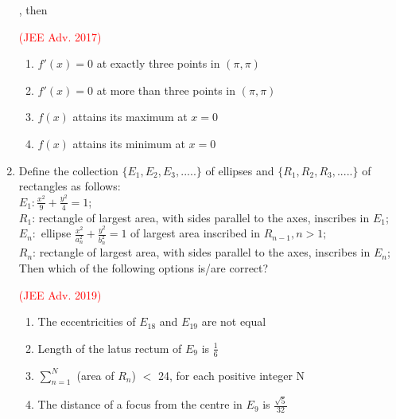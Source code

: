 \documentclass[journal,12pt,twocolumn]{IEEEtran}
\theoremstyle{remark}
\begin{document}
\begin{enumerate}[start = 7]
{\begin{flushleft}
\begin{tabular}{|c c c|}
            \end{tabular} 
            , then
            \begin{flushright}
                \textcolor{red}{(JEE Adv. 2017)}
            \end{flushright}
            \begin{enumerate}
                \item $f'(x) = 0$ at exactly three points in $(\pi,\pi)$
                \item $f'(x) = 0$ at more than three points in $(\pi,\pi)$
                \item $f(x)$ attains its maximum at $x=0$
                \item $f(x)$ attains its minimum at $x=0$
            \end{enumerate}
        \end{flushleft}
        }
    \item{
        \begin{flushleft}
            Define the collection $\{E_1, E_2, E_3, .....\}$ of ellipses and $\{R_1, R_2, R_3, .....\}$ of rectangles as follows:\\[6pt]
            $E_1 : \displaystyle\frac{x^2}{9}+\displaystyle \frac{y^2}{4} = 1$;\\[6pt]
            $R_1$: rectangle of largest area, with sides parallel to the axes, inscribes in $E_1$;\\[6pt]
            $E_n : $ ellipse $\displaystyle\frac{x^2}{a_n^2}+\displaystyle \frac{y^2}{b_n^2} = 1$ of largest area inscribed in $R_{n-1}, n>1;$\\[6pt]
            $R_n$: rectangle of largest area, with sides parallel to the axes, inscribes in $E_n$;\\ Then which of the following options is/are correct?
            \begin{flushright}
                \textcolor{red}{(JEE Adv. 2019)}
            \end{flushright}
            \begin{enumerate}
                \item The eccentricities of $E_{18}$ and $E_{19}$ are not equal
                \item Length of the latus rectum of $E_{9}$ is $\displaystyle\frac{1}{6}$
                \item $\sum_{n=1}^N$ (area of $R_n$) $<$ 24, for each positive integer N
                \item The distance of a focus from the centre in $E_9$ is $\frac{\sqrt{5}}{32}$

\end{enumerate}
\end{flushleft}}
\end{enumerate}
\end{document}
